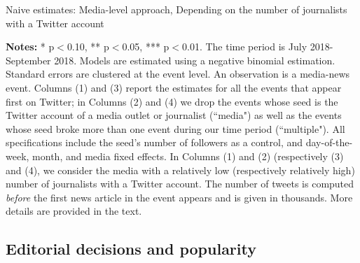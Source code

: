 \begin{table}
\caption{Naive estimates: Media-level approach, Depending on the number of journalists with a Twitter account}
\begin{center}
	
\end{center}
\begin{spacing}{0.5}
	{\fns \textbf{Notes:} * p$<$0.10, ** p$<$0.05, *** p$<$0.01. The time period is July 2018-September 2018. Models are estimated using a negative binomial estimation. Standard errors are clustered at the event level. An observation is a media-news event.  Columns (1) and (3) report the estimates for all the events that appear first on Twitter; in Columns (2) and (4)  we drop the events whose seed is the Twitter account of a media outlet or journalist (``media") as well as the events whose seed broke more than one event during our time period (``multiple"). All specifications include the seed's number of followers as a control, and day-of-the-week, month, and media fixed effects. In Columns (1) and (2) (respectively (3) and (4), we consider the media with a relatively low (respectively relatively high) number of journalists with a Twitter account. The number of tweets is computed \textit{before} the first news article in the event appears and is given in thousands. More details are provided in the text.} 
\end{spacing}
\label{Tab:number_articles_negbinomial_cevent_heterogeneity_nb_journalist_accounts}
\end{table} 



%
%



\subsection{Editorial decisions and popularity}

